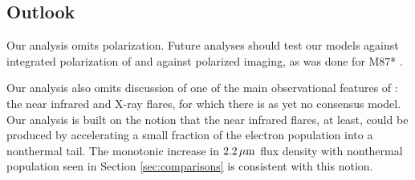 



\subsection{Outlook}\label{sec:future}

Our analysis omits polarization. Future analyses should test our models against integrated polarization of \sgra \citep{2021ApJ...910L..14G} and against polarized imaging, as was done for M87* .

Our analysis also omits discussion of one of the main observational features of \sgra: the near infrared and X-ray flares, for which there is as yet no consensus model. Our analysis is built on the notion that the near infrared flares, at least, could be produced by accelerating a small fraction of the electron population into a nonthermal tail.  The monotonic increase in $2.2\,\mu\mathrm{m}$ flux density with nonthermal population seen in Section \ref{sec:comparisons} is consistent with this notion.

